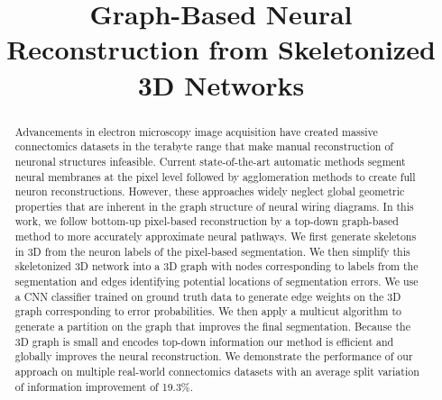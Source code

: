 \documentclass[10pt,twocolumn,letterpaper]{article}
\begin{document}
	
	\title{Graph-Based Neural Reconstruction from Skeletonized 3D Networks}
	
	
	\maketitle
	
	\begin{abstract}
		Advancements in electron microscopy image acquisition have created massive connectomics datasets in the terabyte range that make manual reconstruction of neuronal structures infeasible.
		Current state-of-the-art automatic methods segment neural membranes at the pixel level followed by agglomeration methods to create full neuron reconstructions.
		However, these approaches widely neglect global geometric properties that are inherent in the graph structure of neural wiring diagrams.
		In this work, we follow bottom-up pixel-based reconstruction by a top-down graph-based method to more accurately approximate neural pathways.
		We first generate skeletons in 3D from the neuron labels of the pixel-based segmentation.
		We then simplify this skeletonized 3D network into a 3D graph with nodes corresponding to labels from the segmentation and edges identifying potential locations of segmentation errors.
		We use a CNN classifier trained on ground truth data to generate edge weights on the 3D graph corresponding to error probabilities.
		We then apply a multicut algorithm to generate a partition on the graph that improves the final segmentation.
		Because the 3D graph is small and encodes top-down information our method is efficient and globally improves the neural reconstruction.
		We demonstrate the performance of our approach on multiple real-world connectomics datasets with an average split variation of information improvement of 19.3\%.
	\end{abstract}
	
	
	
	
	
	
	
	
	
	
	
	
	
	
	{\small
		
		}
	
\end{document}
